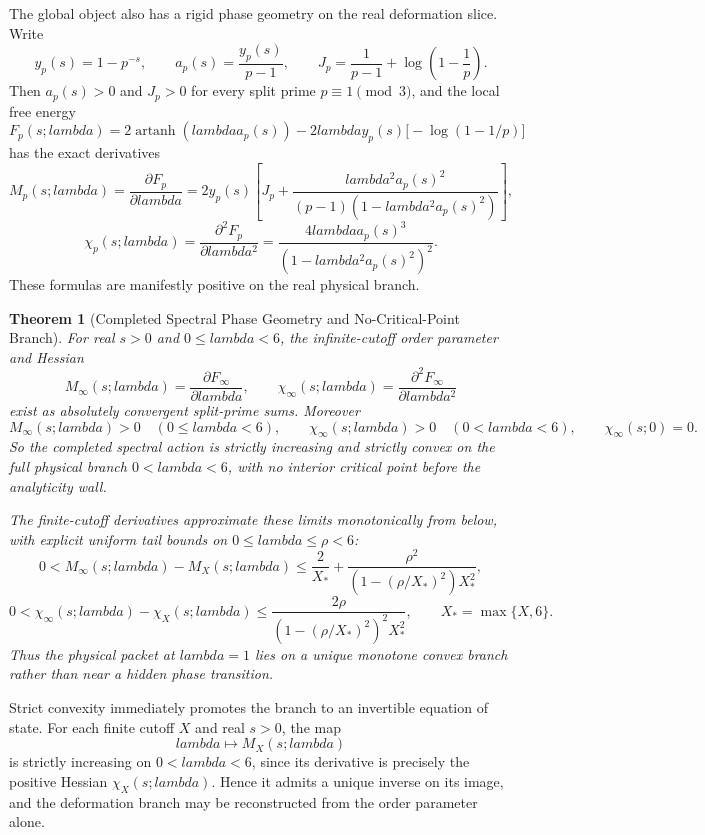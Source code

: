 \documentclass[12pt,a4paper]{article}
\def\mathcal#1{#1}%
\def\lambda{lambda}%
\newtheorem{theorem}{Theorem}[section]
\theoremstyle{definition}
\begin{document}
The global object also has a rigid phase geometry on the real deformation slice. Write
\[
y_p(s)=1-p^{-s},
\qquad
a_p(s)=\frac{y_p(s)}{p-1},
\qquad
J_p=\frac{1}{p-1}+\log\!\left(1-\frac1p\right).
\]
Then $a_p(s)>0$ and $J_p>0$ for every split prime $p\equiv1\pmod3$, and the local free energy
\[
\mathcal F_p(s;\lambda)=2\operatorname{artanh}(\lambda a_p(s))-2\lambda y_p(s)\bigl[-\log(1-1/p)\bigr]
\]
has the exact derivatives
\[
\mathcal M_p(s;\lambda)
=
\frac{\partial\mathcal F_p}{\partial\lambda}
=
2y_p(s)\left[
J_p+\frac{\lambda^2 a_p(s)^2}{(p-1)(1-\lambda^2 a_p(s)^2)}
\right],
\]
\[
\chi_p(s;\lambda)
=
\frac{\partial^2\mathcal F_p}{\partial\lambda^2}
=
\frac{4\lambda a_p(s)^3}{(1-\lambda^2 a_p(s)^2)^2}.
\]
These formulas are manifestly positive on the real physical branch.

\begin{theorem}[Completed Spectral Phase Geometry and No-Critical-Point Branch]
For real $s>0$ and $0\le\lambda<6$, the infinite-cutoff order parameter and Hessian
\[
\mathcal M_\infty(s;\lambda)=\frac{\partial \mathcal F_\infty}{\partial\lambda},
\qquad
\chi_\infty(s;\lambda)=\frac{\partial^2 \mathcal F_\infty}{\partial\lambda^2}
\]
exist as absolutely convergent split-prime sums. Moreover
\[
\mathcal M_\infty(s;\lambda)>0
\quad(0\le\lambda<6),
\qquad
\chi_\infty(s;\lambda)>0
\quad(0<\lambda<6),
\qquad
\chi_\infty(s;0)=0.
\]
So the completed spectral action is strictly increasing and strictly convex on the full physical branch $0<\lambda<6$, with no interior critical point before the analyticity wall.

The finite-cutoff derivatives approximate these limits monotonically from below, with explicit uniform tail bounds on $0\le\lambda\le\rho<6$:
\[
0<\mathcal M_\infty(s;\lambda)-\mathcal M_X(s;\lambda)
\le
\frac{2}{X_*}+\frac{\rho^2}{(1-(\rho/X_*)^2)X_*^2},
\]
\[
0<\chi_\infty(s;\lambda)-\chi_X(s;\lambda)
\le
\frac{2\rho}{(1-(\rho/X_*)^2)^2X_*^2},
\qquad X_*=\max\{X,6\}.
\]
Thus the physical packet at $\lambda=1$ lies on a unique monotone convex branch rather than near a hidden phase transition.
\end{theorem}

Strict convexity immediately promotes the branch to an invertible equation of state. For each finite cutoff $X$ and real $s>0$, the map
\[
\lambda\longmapsto \mathcal M_X(s;\lambda)
\]
is strictly increasing on $0<\lambda<6$, since its derivative is precisely the positive Hessian $\chi_X(s;\lambda)$. Hence it admits a unique inverse on its image, and the deformation branch may be reconstructed from the order parameter alone.
\end{document}
